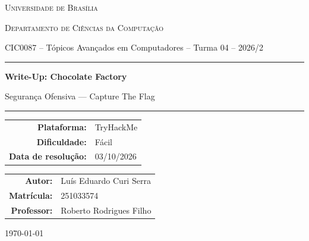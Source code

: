 \documentclass[12pt,a4paper]{article}
\newcommand{\desafioNome}{Chocolate Factory}
\newcommand{\plataforma}{TryHackMe}
\newcommand{\dificuldade}{Fácil}
\newcommand{\dataResolucao}{03/10/2026}
\newcommand{\autorNome}{Luís Eduardo Curi Serra}
\newcommand{\materia}{CIC0087 -- Tópicos Avançados em Computadores -- Turma 04 -- 2026/2}
\newcommand{\departamento}{Departamento de Ciências da Computação}
\newcommand{\matricula}{251033574}
\newcommand{\professor}{Roberto Rodrigues Filho}
\newcommand{\universidade}{Universidade de Brasília}
\begin{document}
\begin{titlepage}
  \thispagestyle{empty}
  \centering
  {\scshape \universidade \par}
  {\scshape \departamento \par}
  \vspace{0.4cm}
  {\small \materia \par}
  \vspace{2.5cm}

  \rule{\linewidth}{0.4pt}\par
  \vspace{0.6cm}
  {\huge \bfseries Write-Up: \desafioNome \par}
  \vspace{0.4cm}
  {\large Segurança Ofensiva --- Capture The Flag \par}
  \vspace{0.6cm}
  \rule{\linewidth}{0.4pt}\par

  \vspace{2.0cm}
  \begin{tabular}{rl}
    \textbf{Plataforma:}       & \plataforma       \\[4pt]
    \textbf{Dificuldade:}      & \dificuldade      \\[4pt]
    \textbf{Data de resolução:}& \dataResolucao    \\
  \end{tabular}

  \vfill

  \begin{tabular}{rl}
    \textbf{Autor:}     & \autorNome  \\[4pt]
    \textbf{Matrícula:} & \matricula  \\[4pt]
    \textbf{Professor:} & \professor  \\
  \end{tabular}

  \vspace{1.2cm}
  {\small \today \par}
\end{titlepage}

\newpage
\tableofcontents
\thispagestyle{fancy}
\newpage

\end{document}
